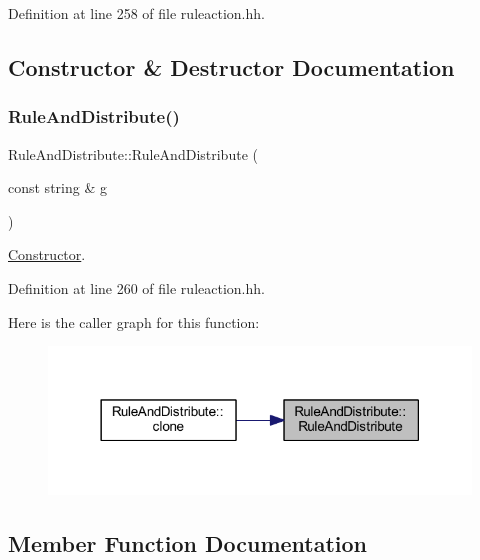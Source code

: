 Definition at line 258 of file ruleaction.\+hh.



\subsection{Constructor \& Destructor Documentation}
\mbox{\label{class_rule_and_distribute_a3495a0359ace14efb37ce9e31cc1cc9d}} 
\subsubsection{\texorpdfstring{RuleAndDistribute()}{RuleAndDistribute()}}
{\footnotesize\ttfamily Rule\+And\+Distribute\+::\+Rule\+And\+Distribute (\begin{DoxyParamCaption}\item[{const string \&}]{g }\end{DoxyParamCaption})\hspace{0.3cm}{\ttfamily [inline]}}



\mbox{\hyperlink{class_constructor}{Constructor}}. 



Definition at line 260 of file ruleaction.\+hh.

Here is the caller graph for this function\+:
\nopagebreak
\begin{figure}[H]
\begin{center}
\leavevmode
\includegraphics[width=318pt]{class_rule_and_distribute_a3495a0359ace14efb37ce9e31cc1cc9d_icgraph}
\end{center}
\end{figure}


\subsection{Member Function Documentation}
\mbox{\label{class_rule_and_distribute_aa40f49c92c7f7088f01ffedff4b5700e}} 
